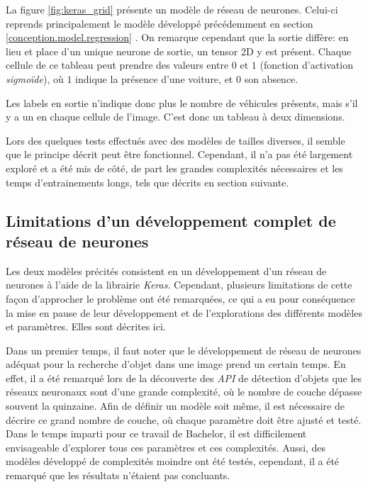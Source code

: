 La figure \ref{fig:keras_grid} présente un modèle de réseau de neurones. Celui-ci reprends principalement le modèle développé précédemment en section \ref{conception.model.regression} . On remarque cependant que la sortie diffère: en lieu et place d'un unique neurone de sortie, un tensor 2D y est présent. Chaque cellule de ce tableau peut prendre des valeurs entre $0$ et $1$ (fonction d'activation \textit{sigmoïde}), où $1$ indique la présence d'une voiture, et $0$ son absence. 

Les labels en sortie n'indique donc plus le nombre de véhicules présents, mais s'il y a un en chaque cellule de l'image. C'est donc un tableau à deux dimensions. 

Lors des quelques tests effectués avec des modèles de tailles diverses, il semble que le principe décrit peut être fonctionnel. Cependant, il n'a pas été largement exploré et a été mis de côté, de part les grandes complexités nécessaires et les temps d'entrainements longs, tels que décrits en section suivante.

\subsection{Limitations d'un développement complet de réseau de neurones} \label{conception.model.limitations}
Les deux modèles précités consistent en un développement d'un réseau de neurones à l'aide de la librairie \textit{Keras}. Cependant, plusieurs limitations de cette façon d'approcher le problème ont été remarquées, ce qui a eu pour conséquence la mise en pause de leur développement et de l'explorations des différents modèles et paramètres. Elles sont décrites ici.

Dans un premier temps, il faut noter que le développement de réseau de neurones adéquat pour la recherche d'objet dans une image prend un certain temps. En effet, il a été remarqué lors de la découverte des \textit{API} de détection d'objets que les réseaux neuronaux sont d'une grande complexité, où le nombre de couche dépasse souvent la quinzaine. Afin de définir un modèle soit même, il est nécessaire de décrire ce grand nombre de couche, où chaque paramètre doit être ajusté et testé. Dans le temps imparti pour ce travail de Bachelor, il est difficilement envisageable d'explorer tous ces paramètres et ces complexités. Aussi, des modèles développé de complexités moindre ont été testés, cependant, il a été remarqué que les résultats n'étaient pas concluants.

